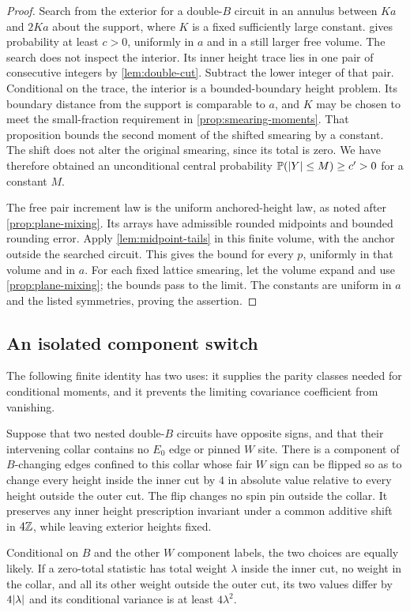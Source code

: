 \begin{proof}
Search from the exterior for a double-$B$ circuit in an annulus between
$Ka$ and $2Ka$ about the support, where $K$ is a fixed sufficiently large
constant.   gives probability at least $c>0$,
uniformly in $a$ and in a still larger free volume.  The search does not
inspect the interior.  Its inner height trace lies in one pair of
consecutive integers by \cref{lem:double-cut}.  Subtract the lower integer
of that pair.  Conditional on the trace, the interior is a bounded-boundary
height problem.  Its boundary distance from the support is comparable to
$a$, and $K$ may be chosen to meet the small-fraction requirement in
\cref{prop:smearing-moments}.  That proposition bounds the second moment
of the shifted smearing by a constant.  The shift does not alter the
original smearing, since its total is zero.  We have therefore obtained
an unconditional central probability $\mathbb P(\lvert Y\rvert\leq M)\geq c'>0$ for a
constant $M$.

The free pair increment law is the uniform anchored-height law, as noted
after \cref{prop:plane-mixing}.  Its arrays have admissible rounded
midpoints and bounded rounding error.  Apply \cref{lem:midpoint-tails}
in this finite volume, with the anchor outside the searched circuit.
This gives the bound for every $p$, uniformly in that volume and in $a$.
For each fixed lattice smearing, let the volume expand and use
\cref{prop:plane-mixing}; the bounds pass to the limit.  The constants are
uniform in $a$ and the listed symmetries, proving the assertion.
\end{proof}

\subsection{An isolated component switch}

The following finite identity has two uses: it supplies the parity classes
needed for conditional moments, and it prevents the limiting covariance
coefficient from vanishing.

\begin{lemma}\label{lem:component-switch}
Suppose that two nested double-$B$ circuits have opposite signs, and that
their intervening collar contains no $E_0$ edge or pinned $W$ site.  There
is a component of $B$-changing edges confined to this collar whose fair
$W$ sign can be flipped so as to change every height inside the inner
cut by $4$ in absolute value relative to every height outside the outer
cut.  The flip changes no spin pin outside the collar.  It preserves any inner
height prescription invariant under a common additive shift in $4\mathbb Z$,
while leaving exterior heights fixed.

Conditional on $B$ and the other $W$ component labels, the two choices
are equally likely.  If a zero-total statistic has total weight $\lambda$
inside the inner cut, no weight in the collar, and all its other weight
outside the outer cut, its two values differ by $4\lvert\lambda\rvert$ and its
conditional variance is at least $4\lambda^2$.
\end{lemma}

